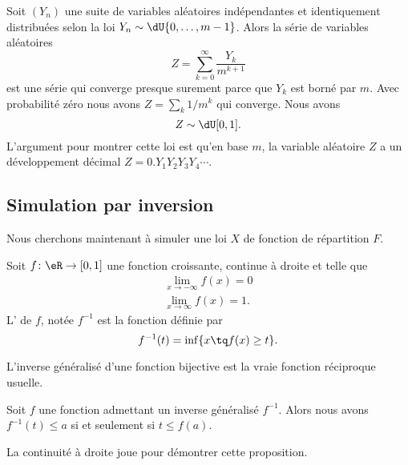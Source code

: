 Soit \( (Y_n)\) une suite de variables aléatoires indépendantes et identiquement distribuées selon la loi \( Y_n\sim\dU\{ 0,\ldots,m-1 \}\). Alors la série de variables aléatoires
\begin{equation}
	Z=\sum_{k=0}^{\infty}\frac{ Y_k }{ m^{k+1} }
\end{equation}
est une série qui converge presque surement parce que \( Y_k\) est borné par \( m\). Avec probabilité zéro nous avons \( Z=\sum_k1/m^k\) qui converge. Nous avons
\begin{equation}
	Z\sim\dU\mathopen[ 0 , 1 \mathclose].
\end{equation}
L'argument pour montrer cette loi est qu'en base \( m\), la variable aléatoire \( Z\) a un développement décimal \( Z=0.Y_1Y_2Y_3Y_4\cdots\).

\subsection{Simulation par inversion}

Nous cherchons maintenant à simuler une loi \( X\) de fonction de répartition \( F\).

\begin{definition}
	Soit \( f\colon \eR\to \mathopen[ 0 , 1 \mathclose]\) une fonction croissante, continue à droite et telle que
	\begin{subequations}
		\begin{align}
			\lim_{x\to -\infty} f(x)=0 \\
			\lim_{x\to \infty} f(x)=1.
		\end{align}
	\end{subequations}
	L' de \( f\), notée \( f^{-1}\) est la fonction définie par
	\begin{equation}
		f^{-1}(t)=\inf\{ x\tq f(x)\geq t \}.
	\end{equation}
\end{definition}

\begin{remark}
	L'inverse généralisé d'une fonction bijective est la vraie fonction réciproque usuelle.
\end{remark}

\begin{proposition}     \label{PropInvgenecntddr}
	Soit \( f\) une fonction admettant un inverse généralisé \( f^{-1}\). Alors nous avons \( f^{-1}(t)\leq a\) si et seulement si \( t\leq f(a)\).
\end{proposition}
La continuité à droite joue pour démontrer cette proposition.


